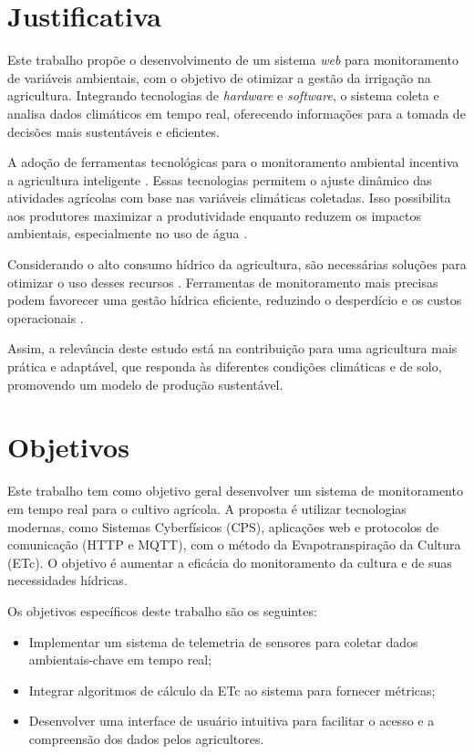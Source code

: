 \section{Justificativa}

Este trabalho propõe o desenvolvimento de um sistema \textit{web} para monitoramento de variáveis ambientais, com o objetivo de otimizar a gestão da irrigação na agricultura. Integrando tecnologias de \textit{hardware} e \textit{software}, o sistema coleta e analisa dados climáticos em tempo real, oferecendo informações para a tomada de decisões mais sustentáveis e eficientes.

A adoção de ferramentas tecnológicas para o monitoramento ambiental incentiva a agricultura inteligente \parencite{Garg_smart2023}. Essas tecnologias permitem o ajuste dinâmico das atividades agrícolas com base nas variáveis climáticas coletadas. Isso possibilita aos produtores maximizar a produtividade enquanto reduzem os impactos ambientais, especialmente no uso de água \parencite{Gurjeet_smart2022}.

Considerando o alto consumo hídrico da agricultura, são necessárias soluções para otimizar o uso desses recursos \parencite{Ramos_irrigacao2022}. Ferramentas de monitoramento mais precisas podem favorecer uma gestão hídrica eficiente, reduzindo o desperdício e os custos operacionais \parencite{carmody_fao2023}.

Assim, a relevância deste estudo está na contribuição para uma agricultura mais prática e adaptável, que responda às diferentes condições climáticas e de solo, promovendo um modelo de produção sustentável.

\section{Objetivos}

Este trabalho tem como objetivo geral desenvolver um sistema de monitoramento em tempo real para o cultivo agrícola. A proposta é utilizar tecnologias modernas, como Sistemas Cyberfísicos (CPS), aplicações web e protocolos de comunicação (HTTP e MQTT), com o método da Evapotranspiração da Cultura (ETc). O objetivo é aumentar a eficácia do monitoramento da cultura e de suas necessidades hídricas.

Os objetivos específicos deste trabalho são os seguintes:

\begin{itemize}
    \item Implementar um sistema de telemetria de sensores para coletar dados ambientais-chave em tempo real;
    \item Integrar algoritmos de cálculo da ETc ao sistema para fornecer métricas;
    \item Desenvolver uma interface de usuário intuitiva para facilitar o acesso e a compreensão dos dados pelos agricultores.
\end{itemize}

